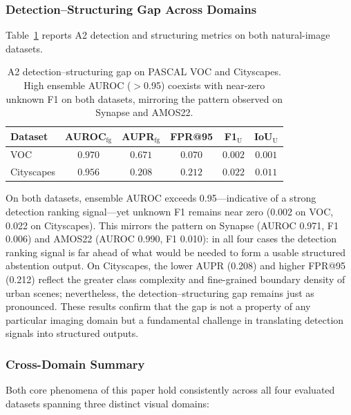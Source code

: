 \documentclass[3p,twocolumn,authoryear]{elsarticle}
\begin{document}
\subsubsection{Detection--Structuring Gap Across Domains}\label{sec:exp:crossdomain:a2}

Table~\ref{tab:crossdomain_a2} reports A2 detection and structuring metrics on both
natural-image datasets.

\begin{table}[!t]
\centering
\caption{A2 detection--structuring gap on PASCAL VOC and Cityscapes.
High ensemble AUROC ($>$0.95) coexists with near-zero unknown F1 on both datasets,
mirroring the pattern observed on Synapse and AMOS22.}
\label{tab:crossdomain_a2}
\footnotesize
\begin{tabular}{l ccc cc}
\toprule
Dataset & AUROC$_{\text{fg}}$ & AUPR$_{\text{fg}}$ & FPR@95 & F1$_{\text{U}}$ & IoU$_{\text{U}}$ \\
\midrule
VOC        & $0.970$ & $0.671$ & $0.070$ & $0.002$ & $0.001$ \\
Cityscapes & $0.956$ & $0.208$ & $0.212$ & $0.022$ & $0.011$ \\
\bottomrule
\end{tabular}
\end{table}

On both datasets, ensemble AUROC exceeds 0.95---indicative of a strong detection
ranking signal---yet unknown F1 remains near zero (0.002 on VOC, 0.022 on Cityscapes).
This mirrors the pattern on Synapse (AUROC 0.971, F1 0.006) and AMOS22 (AUROC 0.990,
F1 0.010): in all four cases the detection ranking signal is far ahead of what would be
needed to form a usable structured abstention output.
On Cityscapes, the lower AUPR (0.208) and higher FPR@95 (0.212) reflect the greater
class complexity and fine-grained boundary density of urban scenes; nevertheless, the
detection--structuring gap remains just as pronounced.
These results confirm that the gap is not a property of any particular imaging domain
but a fundamental challenge in translating detection signals into structured outputs.

\subsubsection{Cross-Domain Summary}\label{sec:exp:crossdomain:summary}

Both core phenomena of this paper hold consistently across all four evaluated datasets
spanning three distinct visual domains:
\end{document}
